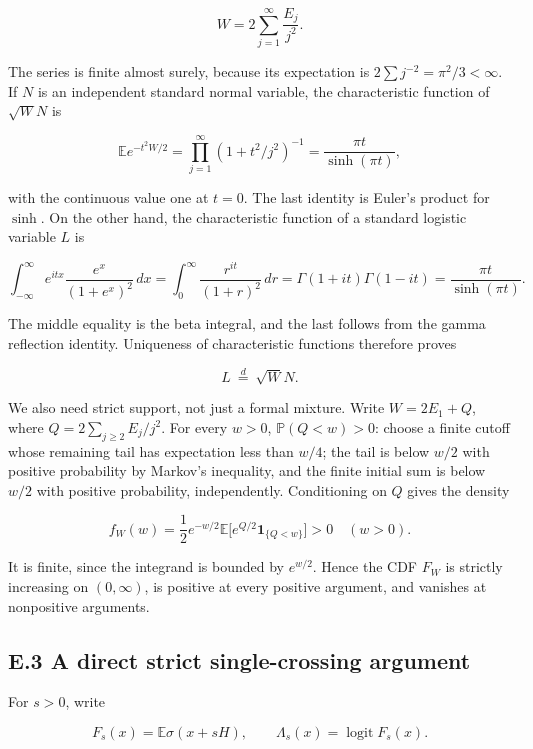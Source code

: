 \documentclass[
  11pt,
  a4paper,
]{article}
\begin{document}
\[
W=2\sum_{j=1}^{\infty}\frac{E_j}{j^2}.
\tag{E.9}
\]

The series is finite almost surely, because its expectation is
\(2\sum j^{-2}=\pi^2/3<\infty\). If \(N\) is an independent standard
normal variable, the characteristic function of \(\sqrt W N\) is

\[
\mathbb E e^{-t^2W/2}
=\prod_{j=1}^{\infty}(1+t^2/j^2)^{-1}
=\frac{\pi t}{\sinh(\pi t)},
\tag{E.10}
\]

with the continuous value one at \(t=0\). The last identity is Euler's
product for \(\sinh\). On the other hand, the characteristic function of
a standard logistic variable \(L\) is

\[
\int_{-\infty}^{\infty}e^{itx}\frac{e^x}{(1+e^x)^2}\,dx
=\int_0^{\infty}\frac{r^{it}}{(1+r)^2}\,dr
=\Gamma(1+it)\Gamma(1-it)
=\frac{\pi t}{\sinh(\pi t)}.
\tag{E.11}
\]

The middle equality is the beta integral, and the last follows from the
gamma reflection identity. Uniqueness of characteristic functions
therefore proves

\[
L\ \overset d=\ \sqrt W N.
\tag{E.12}
\]

We also need strict support, not just a formal mixture. Write
\(W=2E_1+Q\), where \(Q=2\sum_{j\ge2}E_j/j^2\). For every \(w>0\),
\(\mathbb P(Q<w)>0\): choose a finite cutoff whose remaining tail has
expectation less than \(w/4\); the tail is below \(w/2\) with positive
probability by Markov's inequality, and the finite initial sum is below
\(w/2\) with positive probability, independently. Conditioning on \(Q\)
gives the density

\[
f_W(w)=\frac12 e^{-w/2}
\mathbb E\big[e^{Q/2}\mathbf1_{\{Q<w\}}\big]>0
\quad(w>0).
\tag{E.13}
\]

It is finite, since the integrand is bounded by \(e^{w/2}\). Hence the
CDF \(F_W\) is strictly increasing on \((0,\infty)\), is positive at
every positive argument, and vanishes at nonpositive arguments.

\hypertarget{e.3-a-direct-strict-single-crossing-argument}{%
\subsection{E.3 A direct strict single-crossing
argument}\label{e.3-a-direct-strict-single-crossing-argument}}

For \(s>0\), write

\[
F_s(x)=\mathbb E\sigma(x+sH),\qquad
\Lambda_s(x)=\operatorname{logit}F_s(x).
\tag{E.14}
\]
\end{document}
